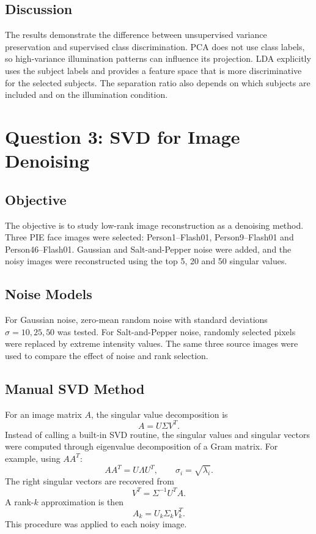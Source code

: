 \documentclass[12pt,a4paper]{report}
\begin{document}
\section{Discussion}
The results demonstrate the difference between unsupervised variance preservation and supervised class discrimination. PCA does not use class labels, so high-variance illumination patterns can influence its projection. LDA explicitly uses the subject labels and provides a feature space that is more discriminative for the selected subjects. The separation ratio also depends on which subjects are included and on the illumination condition.

\chapter{Question 3: SVD for Image Denoising}

\section{Objective}
The objective is to study low-rank image reconstruction as a denoising method. Three PIE face images were selected: Person1--Flash01, Person9--Flash01 and Person46--Flash01. Gaussian and Salt-and-Pepper noise were added, and the noisy images were reconstructed using the top 5, 20 and 50 singular values.

\section{Noise Models}
For Gaussian noise, zero-mean random noise with standard deviations $\sigma=10,25,50$ was tested. For Salt-and-Pepper noise, randomly selected pixels were replaced by extreme intensity values. The same three source images were used to compare the effect of noise and rank selection.

\section{Manual SVD Method}
For an image matrix $A$, the singular value decomposition is
\[
A=U\Sigma V^T.
\]
Instead of calling a built-in SVD routine, the singular values and singular vectors were computed through eigenvalue decomposition of a Gram matrix. For example, using $AA^T$:
\[
AA^T=U\Lambda U^T,\qquad \sigma_i=\sqrt{\lambda_i}.
\]
The right singular vectors are recovered from
\[
V^T=\Sigma^{-1}U^TA.
\]
A rank-$k$ approximation is then
\[
A_k=U_k\Sigma_kV_k^T.
\]
This procedure was applied to each noisy image.
\end{document}
